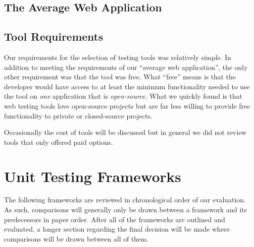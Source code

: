 \documentclass[12pt]{ucthesis}
\begin{document}
\subsection{The Average Web Application}






\subsection{Tool Requirements}
Our requirements for the selection of testing tools was relatively simple. In addition to meeting the requirements of our ``average web application'', the only other requirement was that the tool was free. What ``free'' means is that the developer would have access to at least the minimum functionality needed to use the tool on \emph{one} application that is \emph{open-source}. What we quickly found is that web testing tools love open-source projects but are far less willing to provide free functionality to private or closed-source projects. 

Occasionally the cost of tools will be discussed but in general we did not review tools that only offered paid options.

\section{Unit Testing Frameworks}
The following frameworks are reviewed in chronological order of our evaluation. As such, comparisons will generally only be drawn between a framework and its predecessors in paper order. After all of the frameworks are outlined and evaluated, a longer section regarding the final decision will be made where comparisons will be drawn between all of them. 
\end{document}
